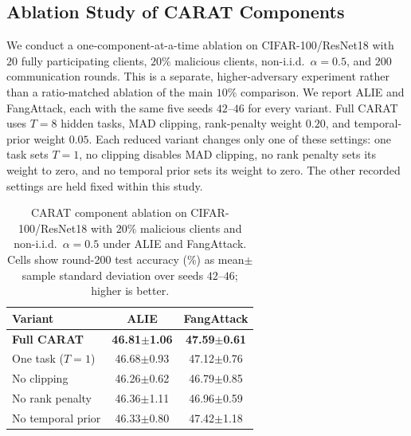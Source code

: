 \FloatBarrier
\subsection{Ablation Study of CARAT Components}
\label{sec:appendix-component-study}

We conduct a one-component-at-a-time ablation on CIFAR-100/ResNet18 with $20$ fully participating clients, $20\%$ malicious clients, non-i.i.d.\ $\alpha=0.5$, and $200$ communication rounds. This is a separate, higher-adversary experiment rather than a ratio-matched ablation of the main $10\%$ comparison. We report ALIE and FangAttack, each with the same five seeds $42$--$46$ for every variant. Full CARAT uses $T=8$ hidden tasks, MAD clipping, rank-penalty weight $0.20$, and temporal-prior weight $0.05$. Each reduced variant changes only one of these settings: one task sets $T=1$, no clipping disables MAD clipping, no rank penalty sets its weight to zero, and no temporal prior sets its weight to zero. The other recorded settings are held fixed within this study.

\begin{table}[!htbp]
  \renewcommand{\arraystretch}{1.05}
  \caption{CARAT component ablation on CIFAR-100/ResNet18 with $20\%$ malicious clients and non-i.i.d.\ $\alpha=0.5$ under ALIE and FangAttack. Cells show round-200 test accuracy (\%) as mean$\pm$sample standard deviation over seeds $42$--$46$; higher is better.}
  \label{tab:carat-ablation}
  \setlength{\tabcolsep}{7pt}
  \centering\small
  \begin{tabular}{lcc}
  \toprule
  \textbf{Variant} & \textbf{ALIE} & \textbf{FangAttack} \\
  \midrule
  \cellcolor{caratrow}\textbf{Full CARAT} & \cellcolor{caratrow}\textbf{46.81$\pm$1.06} & \cellcolor{caratrow}\textbf{47.59$\pm$0.61} \\
  One task ($T=1$) & 46.68$\pm$0.93 & 47.12$\pm$0.76 \\
  No clipping & 46.26$\pm$0.62 & 46.79$\pm$0.85 \\
  No rank penalty & 46.36$\pm$1.11 & 46.96$\pm$0.59 \\
  No temporal prior & 46.33$\pm$0.80 & 47.42$\pm$1.18 \\
  \bottomrule
  \end{tabular}
\end{table}

